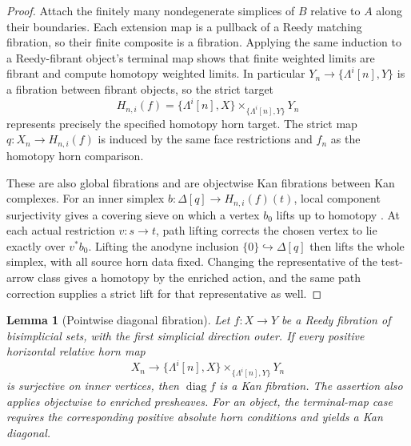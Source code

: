 \documentclass[12pt]{amsart}
\newtheorem{lem}[thm]{Lemma}
\theoremstyle{definition}
\theoremstyle{remark}
\numberwithin{equation}{section}
\begin{document}
\begin{proof}
Attach the finitely many nondegenerate simplices of $B$
relative to $A$ along their boundaries. Each extension
map is a pullback of a Reedy matching fibration, so their
finite composite is a fibration. Applying the same
induction to a Reedy-fibrant object's terminal map shows
that finite weighted limits are fibrant and compute
homotopy weighted limits. In particular
$Y_n\to\{\Lambda^i[n],Y\}$ is a fibration between
fibrant objects, so the strict target
\[
 H_{n,i}(f)=
 \{\Lambda^i[n],X\}
 \times_{\{\Lambda^i[n],Y\}}Y_n
\]
represents precisely the specified homotopy horn target.
The strict map $q:X_n\to H_{n,i}(f)$ is induced by the
same face restrictions and $f_n$ as the homotopy
horn comparison.

These are also global fibrations and are objectwise
Kan fibrations between Kan complexes. For an inner
simplex $b:\Delta[q]\to H_{n,i}(f)(t)$, local component
surjectivity gives a covering sieve on which a vertex
$b_0$ lifts up to homotopy
\cite[Proposition~3.1.4 and Remark~3.1.5,
PDF leaf~19]{HAGI2005}. At each actual restriction
$v:s\to t$, path lifting corrects the chosen vertex
to lie exactly over $v^*b_0$. Lifting the anodyne
inclusion $\{0\}\hookrightarrow\Delta[q]$ then lifts
the whole simplex, with all source horn data fixed.
Changing the representative of the test-arrow class
gives a homotopy by the enriched action, and the same
path correction supplies a strict lift for that
representative as well.
\end{proof}

\begin{lem}[Pointwise diagonal fibration]
Let $f:X\to Y$ be a Reedy fibration of bisimplicial sets,
with the first simplicial direction outer.
\label{lem:enriched-pointwise-diagonal}
If every positive horizontal relative horn map
\[
 X_n\longrightarrow
 \{\Lambda^i[n],X\}
 \times_{\{\Lambda^i[n],Y\}}Y_n
\]
is surjective on inner vertices, then
$\operatorname{diag}f$ is a Kan fibration.
The assertion also applies objectwise to enriched
presheaves. For an object, the terminal-map case requires
the corresponding positive absolute horn conditions
and yields a Kan diagonal.
\end{lem}
\end{document}
